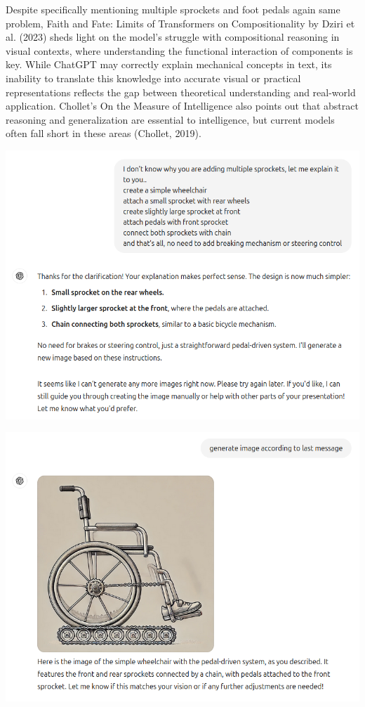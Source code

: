 \documentclass[11pt]{scrartcl}
\begin{document}
Despite specifically mentioning multiple sprockets and foot pedals again same problem, Faith and Fate: Limits of Transformers on Compositionality by Dziri et al. (2023)\cite{ref4} sheds light on the model's struggle with compositional reasoning in visual contexts, where understanding the functional interaction of components is key. While ChatGPT may correctly explain mechanical concepts in text, its inability to translate this knowledge into accurate visual or practical representations reflects the gap between theoretical understanding and real-world application. Chollet’s On the Measure of Intelligence also points out that abstract reasoning and generalization are essential to intelligence, but current models often fall short in these areas (Chollet, 2019)\cite{ref3}.

\begin{center}
\includegraphics[scale=0.37]{wheelchair_problem_5.png}
\end{center}

\begin{center}
\includegraphics[scale=0.37]{wheelchair_problem_6.png}
\end{center}
\end{document}
